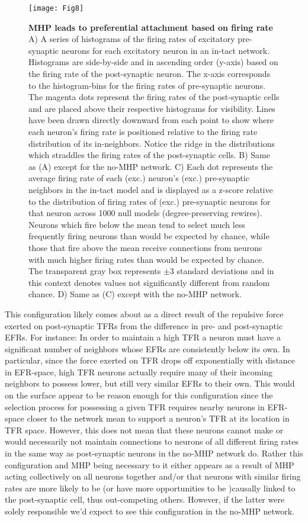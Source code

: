 \documentclass[10pt,letterpaper]{article}
\begin{document}
 \begin{figure}[!h]
 	\centering
 	\texttt{[image: Fig8]}
 	\caption{{\bf MHP leads to preferential attachment based on firing rate}
 		A) A series of histograms of the firing rates of excitatory pre-synaptic neurons for each excitatory neuron in an in-tact network. Histograms are side-by-side and in ascending order (y-axis) based on the firing rate of the post-synaptic neuron. The x-axis corresponds to the histogram-bins for the firing rates of pre-synaptic neurons. The magenta dots represent the firing rates of the post-synaptic cells and are placed above their respective histograms for visibility. Lines have been drawn directly downward from each point to show where each neuron's firing rate is positioned relative to the firing rate distribution of its in-neighbors. Notice the ridge in the distributions which straddles the firing rates of the post-synaptic cells. B) Same as (A) except for the no-MHP network. C) Each dot represents the average firing rate of each (exc.) neuron's (exc.) pre-synaptic neighbors in the in-tact model and is displayed as a z-score relative to the distribution of firing rates of (exc.) pre-synaptic neurons for that neuron across 1000 null models (degree-preserving rewires). Neurons which fire below the mean tend to select much less frequently firing neurons than would be expected by chance, while those that fire above the mean receive connections from neurons with much higher firing rates than would be expected by chance. The transparent gray box represents $\pm$3 standard deviations and in this context denotes values not significantly different from random chance. D) Same as (C) except with the no-MHP network. \footnotesize }
 	\label{Fig8}
 \end{figure}
 
This configuration likely comes about as a direct result of the repulsive force exerted on post-synaptic TFRs from the difference in pre- and post-synaptic EFRs. For instance: In order to maintain a high TFR a neuron must have a significant number of neighbors whose EFRs are consistently below its own. In particular, since the force exerted on TFR drops off exponentially with distance in EFR-space, high TFR neurons actually require many of their incoming neighbors to possess lower, but still very similar EFRs to their own. This would on the surface appear to be reason enough for this configuration since the selection process for possessing a given TFR requires nearby neurons in EFR-space closer to the network mean to support a neuron's TFR at its location in TFR space. However, this does not mean that these neurons cannot make or would necessarily not maintain connections to neurons of all different firing rates in the same way as post-synaptic neurons in the no-MHP network do. Rather this configuration and MHP being necessary to it either appears as a result of MHP acting collectively on all neurons together and/or that neurons with similar firing rates are more likely to be (or have more opportunities to be )causally linked to the post-synaptic cell, thus out-competing others. However, if the latter were solely responsible we'd expect to see this configuration in the no-MHP network.
\end{document}
